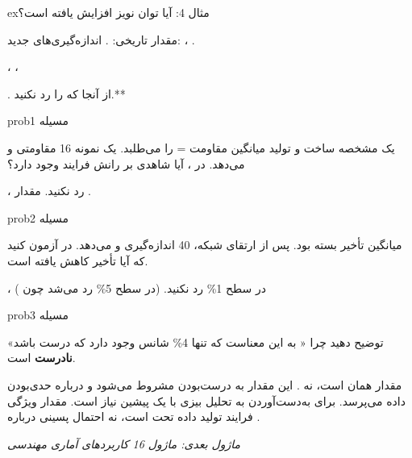 \begin{PSbox}[unbreakable]{ex}{مثال 4: آیا توان نویز افزایش یافته است؟}

مقدار تاریخی: . اندازه‌گیری‌های جدید: ، .

، ، 


. از آنجا که  را رد نکنید.**

\end{PSbox}


\begin{PSbox}[unbreakable]{prob}{مسیله 1}

یک مشخصه ساخت و تولید میانگین مقاومت = \lr{\mbox{100\ensuremath{\Omega}}} را می‌طلبد. یک نمونه 16 مقاومتی  و  می‌دهد. در ، آیا شاهدی بر رانش فرایند وجود دارد؟

\PSsolution{} ،  رد نکنید. مقدار .

\end{PSbox}

\begin{PSbox}[unbreakable]{prob}{مسیله 2}

میانگین تأخیر بسته  بود. پس از ارتقای شبکه، 40 اندازه‌گیری  و  می‌دهد. در  آزمون کنید که آیا تأخیر کاهش یافته است.

\PSsolution{} ،  در سطح 1\% رد نکنید. (در سطح 5\% رد می‌شد چون )

\end{PSbox}

\begin{PSbox}[unbreakable]{prob}{مسیله 3}

توضیح دهید چرا « به این معناست که تنها 4\% شانس وجود دارد که  درست باشد» \textbf{نادرست} است.

\PSsolution{} مقدار  همان  است، نه . این مقدار به  درست‌بودن مشروط می‌شود و درباره حدی‌بودن داده می‌پرسد. برای به‌دست‌آوردن  به تحلیل بیزی با یک پیشین نیاز است. مقدار  ویژگی فرایند تولید داده تحت  است، نه احتمال پسینی درباره .

\emph{ماژول بعدی: {ماژول 16  کاربردهای آماری مهندسی}}

\end{PSbox}
